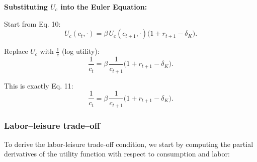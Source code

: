{\bf Substituting \(U_c\) into the Euler Equation:}

Start from Eq. 10:
\[
U_c(c_t,\cdot) = \beta\,U_c(c_{t+1},\cdot)\bigl(1 + r_{t+1} - \delta_K\bigr). \tag{10}
\]

Replace \(U_c\) with \(\frac{1}{c}\) (log utility):
\[
\frac{1}{c_t} = \beta\,\frac{1}{c_{t+1}}\bigl(1 + r_{t+1} - \delta_K\bigr).
\]

This is exactly Eq. 11:
\[
\boxed{\frac{1}{c_t} = \beta\,\frac{1}{c_{t+1}}\bigl(1 + r_{t+1} - \delta_K\bigr)}. \tag{11}
\]











\subsubsection{Labor--leisure trade–off }

To derive the labor-leisure trade-off condition, we start by computing the partial derivatives of the utility function with respect to consumption and labor:

